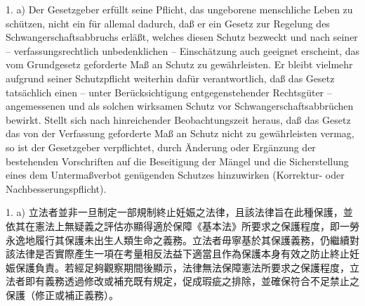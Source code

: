 \documentclass[12pt]{article}
\begin{document}
\begin{sourcepara}[title={原文E.188}]
1. a) Der Gesetzgeber erfüllt seine Pflicht, das ungeborene menschliche Leben zu schützen, nicht ein für allemal dadurch, daß er ein Gesetz zur Regelung des Schwangerschaftsabbruchs erläßt, welches diesen Schutz bezweckt und nach seiner -- verfassungsrechtlich unbedenklichen -- Einschätzung auch geeignet erscheint, das vom Grundgesetz geforderte Maß an Schutz zu gewährleisten. Er bleibt vielmehr aufgrund seiner Schutzpflicht weiterhin dafür verantwortlich, daß das Gesetz tatsächlich einen -- unter Berücksichtigung entgegenstehender Rechtsgüter -- angemessenen und als solchen wirksamen Schutz vor Schwangerschaftsabbrüchen bewirkt. Stellt sich nach hinreichender Beobachtungszeit heraus, daß das Gesetz das von der Verfassung geforderte Maß an Schutz nicht zu gewährleisten vermag, so ist der Gesetzgeber verpflichtet, durch Änderung oder Ergänzung der bestehenden Vorschriften auf die Beseitigung der Mängel und die Sicherstellung eines dem Untermaßverbot genügenden Schutzes hinzuwirken (Korrektur- oder Nachbesserungspflicht).
\end{sourcepara}
\begin{transpara}
1. a) 立法者並非一旦制定一部規制終止妊娠之法律，且該法律旨在此種保護，並依其在憲法上無疑義之評估亦顯得適於保障《基本法》所要求之保護程度，即一勞永逸地履行其保護未出生人類生命之義務。立法者毋寧基於其保護義務，仍繼續對該法律是否實際產生一項在考量相反法益下適當且作為保護本身有效之防止終止妊娠保護負責。若經足夠觀察期間後顯示，法律無法保障憲法所要求之保護程度，立法者即有義務透過修改或補充既有規定，促成瑕疵之排除，並確保符合不足禁止之保護（修正或補正義務）。
\end{transpara}
\end{document}
